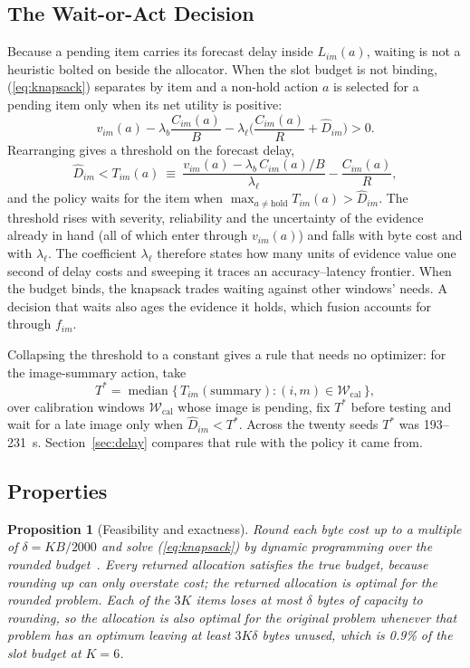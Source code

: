 \documentclass[conference,a4paper]{IEEEtran}
\newtheorem{proposition}{Proposition}
\begin{document}
\subsection{The Wait-or-Act Decision}
\label{sec:wait}
Because a pending item carries its forecast delay inside $L_{im}(a)$, waiting is not a heuristic bolted on beside the allocator. When the slot budget is not binding, (\ref{eq:knapsack}) separates by item and a non-hold action $a$ is selected for a pending item only when its net utility is positive:
\begin{equation}
v_{im}(a)-\lambda_b\frac{C_{im}(a)}{B}-\lambda_\ell\Big(\frac{C_{im}(a)}{R}+\hat D_{im}\Big)>0.
\end{equation}
Rearranging gives a threshold on the forecast delay,
\begin{equation}
\label{eq:threshold}
\hat D_{im}<T_{im}(a)\ \equiv\ \frac{v_{im}(a)-\lambda_b\,C_{im}(a)/B}{\lambda_\ell}-\frac{C_{im}(a)}{R},
\end{equation}
and the policy waits for the item when $\max_{a\neq\text{hold}}T_{im}(a)>\hat D_{im}$. The threshold rises with severity, reliability and the uncertainty of the evidence already in hand (all of which enter through $v_{im}(a)$) and falls with byte cost and with $\lambda_\ell$. The coefficient $\lambda_\ell$ therefore states how many units of evidence value one second of delay costs and sweeping it traces an accuracy--latency frontier. When the budget binds, the knapsack trades waiting against other windows' needs. A decision that waits also ages the evidence it holds, which fusion accounts for through $f_{im}$.

Collapsing the threshold to a constant gives a rule that needs no optimizer: for the image-summary action, take
\begin{equation}
\label{eq:tstar}
T^\ast=\operatorname{median}\{\,T_{im}(\text{summary}): (i,m)\in\mathcal W_{\mathrm{cal}}\,\},
\end{equation}
over calibration windows $\mathcal W_{\mathrm{cal}}$ whose image is pending, fix $T^\ast$ before testing and wait for a late image only when $\hat D_{im}<T^\ast$. Across the twenty seeds $T^\ast$ was 193--231~s. Section~\ref{sec:delay} compares that rule with the policy it came from.

\subsection{Properties}
\begin{proposition}[Feasibility and exactness]\label{prop:exact}
Round each byte cost up to a multiple of $\delta=KB/2000$ and solve (\ref{eq:knapsack}) by dynamic programming over the rounded budget~\cite{knapsack}. Every returned allocation satisfies the true budget, because rounding up can only overstate cost; the returned allocation is optimal for the rounded problem. Each of the $3K$ items loses at most $\delta$ bytes of capacity to rounding, so the allocation is also optimal for the original problem whenever that problem has an optimum leaving at least $3K\delta$ bytes unused, which is 0.9\% of the slot budget at $K=6$.
\end{proposition}
\end{document}
